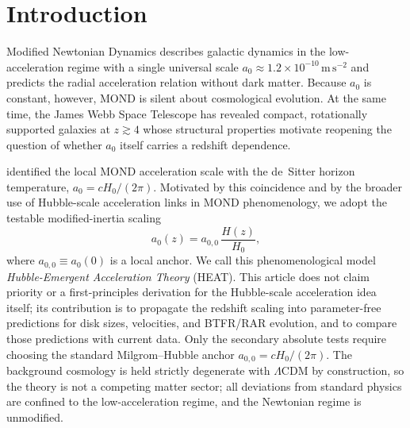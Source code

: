 \documentclass[twocolumn,letterpaper]{aastex631}
\newcommand{\azero}{a_0}
\newcommand{\lcdm}{\Lambda\mathrm{CDM}}
\newcommand{\azerolocal}{a_{0,0}}
\begin{document}
\section{Introduction}\label{sec:intro}

Modified Newtonian Dynamics
\citep[MOND;][]{Milgrom1983,FamaeyMcGaugh2012} describes galactic
dynamics in the low-acceleration regime with a single universal
scale $\azero\!\approx\!1.2\times10^{-10}\,\mathrm{m\,s^{-2}}$ and
predicts the radial acceleration relation
\citep[RAR;][]{McGaugh2016,Lelli2016} without dark matter.
Because $\azero$ is constant, however, MOND is silent about
cosmological evolution.  At the same time, the James Webb Space
Telescope has revealed compact, rotationally supported galaxies
at $z\!\gtrsim\!4$ \citep{Labbe2023,Carniani2024,Bunker2023}
whose structural properties motivate reopening the question of
whether $\azero$ itself carries a redshift dependence.

\citet{Milgrom1999} identified the local MOND acceleration scale
with the de~Sitter horizon temperature, $\azero=cH_0/(2\pi)$.
Motivated by this coincidence and by the broader use of
Hubble-scale acceleration links in MOND phenomenology, we adopt
the testable modified-inertia scaling
\begin{equation}\label{eq:a0scale}
  \azero(z)=\azerolocal\,\frac{H(z)}{H_{0}},
\end{equation}
where $\azerolocal\equiv\azero(0)$ is a local anchor.  We call this
phenomenological model \emph{Hubble-Emergent Acceleration Theory}
(HEAT).  This article does not claim priority or a first-principles
derivation for the Hubble-scale acceleration idea itself; its
contribution is to propagate the redshift scaling into
parameter-free predictions for disk sizes, velocities, and
BTFR/RAR evolution, and to compare those predictions with current
data.  Only the secondary absolute tests require choosing the
standard Milgrom--Hubble anchor
$\azerolocal=cH_{0}/(2\pi)$.  The background cosmology is held
strictly degenerate with
$\lcdm$
by construction, so the theory is not a competing matter sector;
all deviations from standard physics are confined to the
low-acceleration regime, and the Newtonian regime is unmodified.
\end{document}
